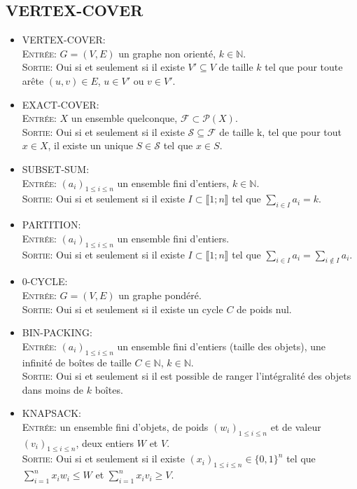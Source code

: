 \subsection*{VERTEX-COVER}
\begin{itemize}
\item VERTEX-COVER: \\
  \textsc{Entrée}: $G = (V, E)$ un graphe non orienté, $k\in \mathbb{N}$. \\
  \textsc{Sortie}: Oui si et seulement si il existe $V' \subseteq V$ de
  taille $k$ tel que pour toute arête $(u,v) \in E$, $u \in V '$ ou $v \in
  V'$.\\
\item EXACT-COVER: \\
  \textsc{Entrée}: $X$ un ensemble quelconque, $\mathcal{F} \subset
  \mathcal{P}(X)$. \\
  \textsc{Sortie}: Oui si et seulement si il existe
  $\mathcal{S} \subseteq \mathcal{F}$ de taille k, tel que pour tout
  $x \in X$, il existe un unique $S \in \mathcal{S}$ tel que $x \in S$. \\
\item SUBSET-SUM: \\
  \textsc{Entrée}: $(a_{i})_{1 \leq i \leq n}$ un ensemble fini
  d'entiers, $k \in \mathbb{N}$. \\
  \textsc{Sortie}: Oui si et seulement si il existe
  $I \subset \llbracket 1;n \rrbracket$ tel que
  $\sum_{i \in I} a_{i} = k$. \\
\item PARTITION: \\
  \textsc{Entrée}: $(a_{i})_{1 \leq i \leq n}$ un ensemble fini d'entiers. \\
  \textsc{Sortie}: Oui si et seulement si il existe
  $I \subset \llbracket 1;n \rrbracket$ tel que
  $\sum_{i \in I} a_{i} = \sum_{i\notin I} a_{i}$. \\
\item 0-CYCLE: \\
  \textsc{Entrée}: $G = (V, E)$ un graphe pondéré. \\
  \textsc{Sortie}: Oui si et seulement si il existe un cycle $C$ de
  poids nul. \\
\item BIN-PACKING: \\
  \textsc{Entrée}: $(a_{i})_{1 \leq i \leq n}$ un ensemble fini
  d'entiers (taille des objets), une infinité de boîtes de taille $C \in
  \mathbb{N}$, $k \in \mathbb{N}$. \\
  \textsc{Sortie}: Oui si et seulement si il est possible de ranger
  l'intégralité des objets dans moins de $k$ boîtes.\\
\item KNAPSACK: \\
  \textsc{Entrée}: un ensemble fini d'objets, de poids
  $(w_{i})_{1 \leq i \leq n}$ et de valeur $(v_{i})_{1 \leq i \leq
    n}$, deux entiers $W$ et $V$. \\
  \textsc{Sortie}: Oui si et seulement si il existe
  $(x_{i})_{1 \leq i \leq n} \in \{0, 1\}^{n}$
  tel que $\sum_{i = 1}^{n} x_{i}w_{i} \leq W$ et $\sum_{i
    = 1}^{n} x_{i}v_{i} \geq V$.\\
\end{itemize}

